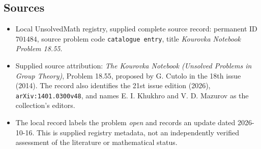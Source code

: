 \documentclass[11pt]{article}
\begin{document}
\subsection{Sources}
\begin{itemize}
\item Local UnsolvedMath registry, supplied complete source record: permanent ID \(701484\), source problem code \texttt{catalogue entry}, title \emph{Kourovka Notebook Problem 18.55}.
\item Supplied source attribution: \emph{The Kourovka Notebook (Unsolved Problems in Group Theory)}, Problem 18.55, proposed by G. Cutolo in the 18th issue (2014). The record also identifies the 21st issue edition (2026), \texttt{arXiv:1401.0300v48}, and names E. I. Khukhro and V. D. Mazurov as the collection's editors.
\item The local record labels the problem \emph{open} and records an update dated 2026-10-16. This is supplied registry metadata, not an independently verified assessment of the literature or mathematical status.
\end{itemize}
\end{document}
